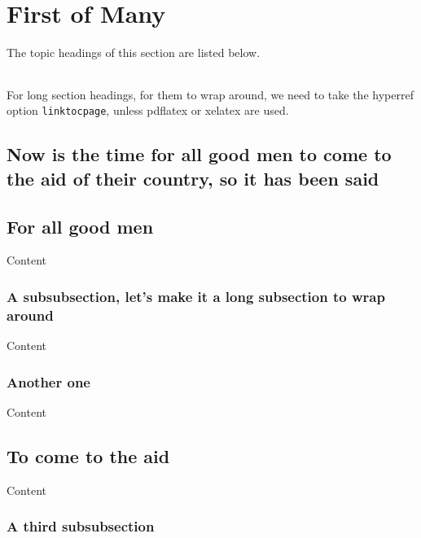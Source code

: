 \documentclass{article}
\newcommand{\insMinitoctab}[2][]{%
    \begin{center}#2
    \begin{tabular}{c}\toprule
    \begin{minipage}[c]{0.8\linewidth}
    \insertminitoc[#1]
    \end{minipage}\\ \bottomrule
    \end{tabular}
    \end{center}
}
\begin{document}
\tableofcontents

\newpage


\section{First of Many}

The topic headings of this section are listed below.

\insMinitoctab{\minitocFmt}

For long section headings, for them to wrap around, we need to take the hyperref option
\texttt{linktocpage}, unless pdflatex or xelatex are used.

\subsection{Now is the time for all good men to come to the aid  of their country, so it has been said}


\subsection{For all good men}

Content

\subsubsection{A subsubsection, let's make it a long subsection to wrap around}

Content

\subsubsection{Another one}

Content

\subsection{To come to the aid}

Content

\subsubsection{A third subsubsection}
\end{document}

